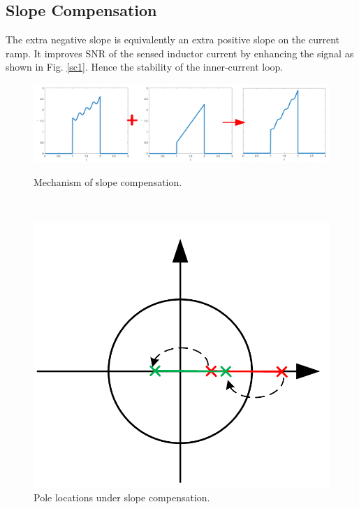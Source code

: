 \subsection{Slope Compensation} \label{sec:solution_subsec:slopecompensation}
The extra negative slope is equivalently an extra positive slope on the current ramp. It improves SNR of the sensed inductor current by enhancing the signal as shown in Fig. \ref{sc1}. Hence the stability of the inner-current loop.

\begin{figure}
\begin{minipage}{0.32\textwidth}
    \centering
    \includegraphics[width=\textwidth]{Figure/section3/slopecompensation/slopecomp.png}
    \caption{ \label{fig:sc1} Mechanism of slope compensation.}
\end{minipage}
~
\begin{minipage}{0.32\textwidth}
    \centering
    \includegraphics[width=\textwidth]{Figure/section3/slopecompensation/slopecomppole.PNG}
  \caption{  \label{fig:sc2} Pole locations under slope compensation.}
\end{minipage}
\end{figure}

